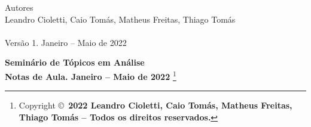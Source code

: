 \documentclass[12pt, oneside]{book}
\begin{document}
\frontmatter 


\noindent
{\huge Autores}
\\[0.3cm]
Leandro Cioletti, Caio Tomás, Matheus Freitas, Thiago Tomás
\\
\bigskip
\\[-0.1cm]
Versão 1.  Janeiro -- Maio de 2022
\\[0.3cm]
\noindent



\vfill
{\fontsize{14pt}{14pt}\selectfont
	\noindent
   \textbf{Seminário de Tópicos em Análise \\ Notas de Aula.  Janeiro -- Maio de 2022}
   \footnote{
   		Copyright \copyright\ 
   		\textbf{2022 Leandro Cioletti, Caio Tomás, Matheus Freitas, Thiago Tomás -- Todos os direitos reservados.}
   	}
 }



\tableofcontents
{}



 
\mainmatter 
\end{document}
